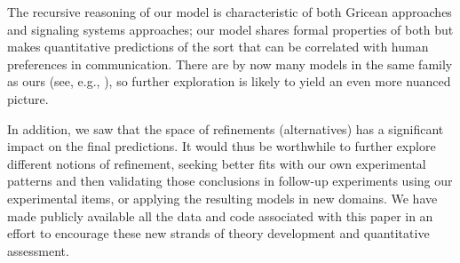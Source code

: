 \documentclass[leqno]{article}
\begin{document}
The recursive reasoning of our model is characteristic of both Gricean
approaches and signaling systems approaches; our model shares formal
properties of both but makes quantitative predictions of the sort that
can be correlated with human preferences in communication. There are
by now many models in the same family as ours (see, e.g.,
\citealt{CamererHo:2004,Jaeger:2011,Smith:Goodman:Frank:2013,Kao-etal:2014}),
so further exploration is likely to yield an even more nuanced
picture.

In addition, we saw that the space of refinements (alternatives) has a
significant impact on the final predictions. It would thus be
worthwhile to further explore different notions of refinement, seeking
better fits with our own experimental patterns and then validating
those conclusions in follow-up experiments using our experimental
items, or applying the resulting models in new domains.  We have made
publicly available all the data and code associated with this paper in
an effort to encourage these new strands of theory development and
quantitative assessment.




\setlength{\bibsep}{0pt}

\end{document}
